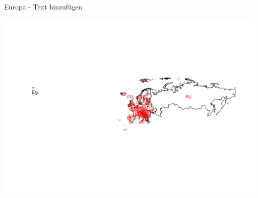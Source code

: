 \documentclass[ignorenonframetext,]{beamer}
\newenvironment{Shaded}{\begin{snugshade}}{\end{snugshade}}
\newcommand{\KeywordTok}[1]{\textcolor[rgb]{0.26,0.66,0.93}{\textbf{#1}}}
\newcommand{\DataTypeTok}[1]{\textcolor[rgb]{0.74,0.68,0.62}{\underline{#1}}}
\newcommand{\StringTok}[1]{\textcolor[rgb]{0.02,0.61,0.04}{#1}}
\newcommand{\OperatorTok}[1]{\textcolor[rgb]{0.74,0.68,0.62}{#1}}
\newcommand{\NormalTok}[1]{\textcolor[rgb]{0.74,0.68,0.62}{#1}}
\begin{document}
\begin{frame}[fragile]{Europa - Text hinzufügen}

\begin{Shaded}
\end{Shaded}

\includegraphics{Geomedizin_files/figure-beamer/unnamed-chunk-71-1.pdf}

\end{frame}
\end{document}
